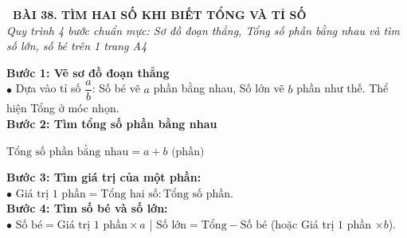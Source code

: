 \documentclass[14pt,a4paper,oneside]{extbook}
\begin{document}
\noindent
\begin{tcolorbox}[
  enhanced,
  colback=teal!8!white,
  colframe=teal!80!black,
  arc=3mm,
  boxrule=1.1pt,
  width=\linewidth,
  halign=center,
  top=2.2mm, bottom=2.2mm,
  left=3mm, right=3mm,
  drop fuzzy shadow
]
  {\large\bfseries\color{teal!95!black}\faBookmark\ BÀI 38. TÌM HAI SỐ KHI BIẾT TỔNG VÀ TỈ SỐ}\\[2pt]
  {\scriptsize\color{black!75}\itshape Quy trình 4 bước chuẩn mực: Sơ đồ đoạn thẳng, Tổng số phần bằng nhau và tìm số lớn, số bé trên 1 trang A4}
\end{tcolorbox}

\vspace{3.2mm}
\noindent
\begin{tcolorbox}[
  enhanced,
  title={\footnotesize\bfseries\color{white}\faKey\ 1. Bốn bước vàng giải bài toán Tổng -- Tỉ},
  colback=blue!2!white,
  colframe=blue!75!black,
  arc=2.5mm, boxrule=0.8pt, top=1.8mm, bottom=1.8mm, left=2.5mm, right=2.5mm
]
  \footnotesize
  \textbf{Bước 1: Vẽ sơ đồ đoạn thẳng}\\
  $\bullet$ Dựa vào tỉ số $\dfrac{a}{b}$: Số bé vẽ $a$ phần bằng nhau, Số lớn vẽ $b$ phần như thế. Thể hiện Tổng ở móc nhọn.\\
  \textbf{Bước 2: Tìm tổng số phần bằng nhau}\\
  \begin{tcolorbox}[colback=white, colframe=blue!75!black, boxrule=0.5pt, arc=1.5mm, halign=center, top=1mm, bottom=1mm]
    {\scriptsize\bfseries\color{blue!90!black}$\text{Tổng số phần bằng nhau} = a + b\text{ (phần)}$}
  \end{tcolorbox}
  \textbf{Bước 3: Tìm giá trị của một phần:}\\
  $\bullet$ $\text{Giá trị } 1\text{ phần} = \text{Tổng hai số} : \text{Tổng số phần}$.\\
  \textbf{Bước 4: Tìm số bé và số lớn:}\\
  $\bullet$ $\text{Số bé} = \text{Giá trị } 1\text{ phần} \times a$ \quad | \quad $\text{Số lớn} = \text{Tổng} - \text{Số bé}$ (hoặc Giá trị $1$ phần $\times b$).
\end{tcolorbox}

\vspace{3mm}
\end{document}
